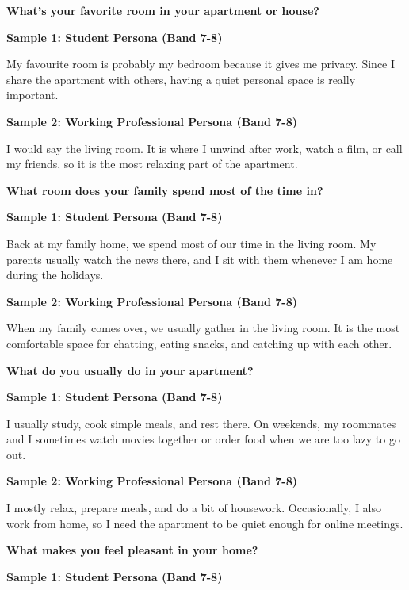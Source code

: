\separator

\begin{ieltsquestion}
\textbf{What's your favorite room in your apartment or house?}
\end{ieltsquestion}
\textbf{Sample 1: Student Persona (Band 7-8)}

My favourite room is probably my bedroom because it gives me privacy. Since I share the apartment with others, having a quiet personal space is really important.

\textbf{Sample 2: Working Professional Persona (Band 7-8)}

I would say the living room. It is where I unwind after work, watch a film, or call my friends, so it is the most relaxing part of the apartment.

\separator

\begin{ieltsquestion}
\textbf{What room does your family spend most of the time in?}
\end{ieltsquestion}
\textbf{Sample 1: Student Persona (Band 7-8)}

Back at my family home, we spend most of our time in the living room. My parents usually watch the news there, and I sit with them whenever I am home during the holidays.

\textbf{Sample 2: Working Professional Persona (Band 7-8)}

When my family comes over, we usually gather in the living room. It is the most comfortable space for chatting, eating snacks, and catching up with each other.

\separator

\begin{ieltsquestion}
\textbf{What do you usually do in your apartment?}
\end{ieltsquestion}
\textbf{Sample 1: Student Persona (Band 7-8)}

I usually study, cook simple meals, and rest there. On weekends, my roommates and I sometimes watch movies together or order food when we are too lazy to go out.

\textbf{Sample 2: Working Professional Persona (Band 7-8)}

I mostly relax, prepare meals, and do a bit of housework. Occasionally, I also work from home, so I need the apartment to be quiet enough for online meetings.

\separator

\begin{ieltsquestion}
\textbf{What makes you feel pleasant in your home?}
\end{ieltsquestion}
\textbf{Sample 1: Student Persona (Band 7-8)}

